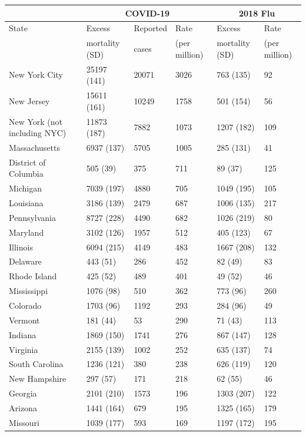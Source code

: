 \documentclass[11pt]{article}
\begin{document}
\begin{table}
\centering
\tiny
\begin{tabular}{|l|lll|ll|}
  \hline
 & \multicolumn{3}{c|}{COVID-19} & \multicolumn{2}{c|}{2018 Flu} \\
\hline
State & Excess & Reported & Rate  & Excess & Rate \\
 & mortality (SD) & cases & (per million) & mortality (SD) & (per million) \\
\hline
New York City & 25197 (141) & 20071 & 3026 & 763 (135) & 92 \\ 
  New Jersey & 15611 (161) & 10249 & 1758 & 501 (154) & 56 \\ 
  New York (not including NYC) & 11873 (187) & 7882 & 1073 & 1207 (182) & 109 \\ 
  Massachusetts & 6937 (137) & 5705 & 1005 & 285 (131) & 41 \\ 
  District of Columbia & 505 (39) & 375 & 711 & 89 (37) & 125 \\ 
  Michigan & 7039 (197) & 4880 & 705 & 1049 (195) & 105 \\ 
  Louisiana & 3186 (139) & 2479 & 687 & 1006 (135) & 217 \\ 
  Pennsylvania & 8727 (228) & 4490 & 682 & 1026 (219) & 80 \\ 
  Maryland & 3102 (126) & 1957 & 512 & 405 (123) & 67 \\ 
  Illinois & 6094 (215) & 4149 & 483 & 1667 (208) & 132 \\ 
  Delaware & 443 (51) & 286 & 452 & 82 (49) & 83 \\ 
  Rhode Island & 425 (52) & 489 & 401 & 49 (52) & 46 \\ 
  Mississippi & 1076 (98) & 510 & 362 & 773 (96) & 260 \\ 
  Colorado & 1703 (96) & 1192 & 293 & 284 (96) & 49 \\ 
  Vermont & 181 (44) & 53 & 290 & 71 (43) & 113 \\ 
  Indiana & 1869 (150) & 1741 & 276 & 867 (147) & 128 \\ 
  Virginia & 2155 (139) & 1002 & 252 & 635 (137) & 74 \\ 
  South Carolina & 1236 (121) & 380 & 238 & 626 (119) & 120 \\ 
  New Hampshire & 297 (57) & 171 & 218 & 62 (55) & 46 \\ 
  Georgia & 2101 (210) & 1573 & 196 & 1303 (207) & 122 \\ 
  Arizona & 1441 (164) & 679 & 195 & 1325 (165) & 179 \\ 
  Missouri & 1039 (177) & 593 & 169 & 1197 (172) & 195 \\ 

\end{tabular}
\end{table}
\end{document}
